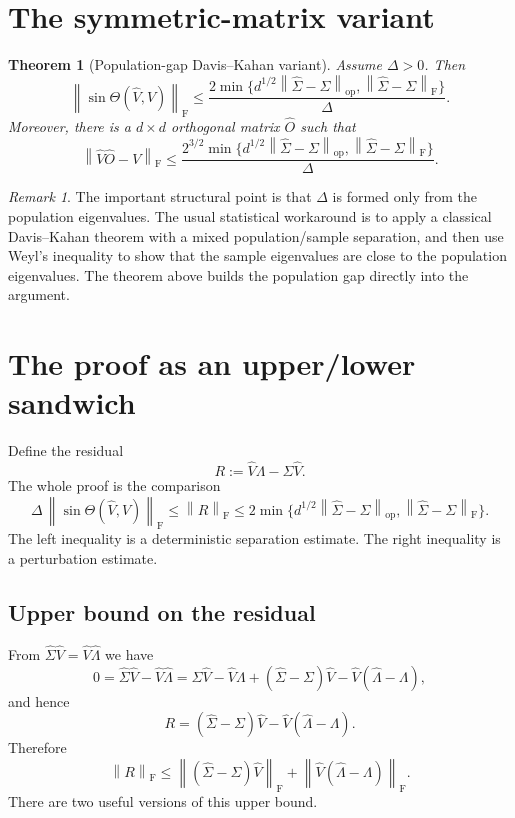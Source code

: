 \documentclass[11pt]{article}
\newcommand{\BaseMat}{\Sigma}
\newcommand{\PertMat}{\widehat{\Sigma}}
\newcommand{\ErrMat}{\widehat{\Sigma}-\Sigma}
\newcommand{\Sub}{V}
\newcommand{\Subhat}{\widehat V}
\newcommand{\EigDiag}{\Lambda}
\newcommand{\EigDiagHat}{\widehat\Lambda}
\newcommand{\AlignMat}{\widehat O}
\newcommand{\BaseMat}{A}
\newcommand{\PertMat}{\widetilde A}
\newcommand{\ErrMat}{\widetilde A-A}
\newcommand{\Sub}{Q}
\newcommand{\Subhat}{\widetilde Q}
\newcommand{\EigDiag}{D}
\newcommand{\EigDiagHat}{\widetilde D}
\newcommand{\AlignMat}{O}
\newcommand{\gap}{\Delta}
\newcommand{\norm}[1]{\left\lVert #1 \right\rVert}
\newcommand{\op}{\mathrm{op}}
\newcommand{\F}{\mathrm F}
\newtheorem{theorem}{Theorem}
\theoremstyle{remark}
\newtheorem*{remark}{Remark}
\begin{document}
\section{The symmetric-matrix variant}

\begin{theorem}[Population-gap Davis--Kahan variant]
Assume $\gap>0$.  Then
\[
  \norm{\sin\Theta(\Subhat,\Sub)}_{\F}
  \leq
  \frac{2\min\{d^{1/2}\norm{\ErrMat}_{\op},\norm{\ErrMat}_{\F}\}}{\gap}.
\]
Moreover, there is a $d\times d$ orthogonal matrix $\AlignMat$ such that
\[
  \norm{\Subhat\AlignMat-\Sub}_{\F}
  \leq
  \frac{2^{3/2}\min\{d^{1/2}\norm{\ErrMat}_{\op},\norm{\ErrMat}_{\F}\}}{\gap}.
\]
\end{theorem}

\begin{remark}
The important structural point is that $\gap$ is formed only from the
population eigenvalues.  The usual statistical workaround is to apply a
classical Davis--Kahan theorem with a mixed population/sample separation,
and then use Weyl's inequality to show that the sample eigenvalues are close
to the population eigenvalues.  The theorem above builds the population gap
directly into the argument.
\end{remark}

\section{The proof as an upper/lower sandwich}

Define the residual
\[
  R := \Subhat\EigDiag-\BaseMat\Subhat.
\]
The whole proof is the comparison
\[
  \gap\,\norm{\sin\Theta(\Subhat,\Sub)}_{\F}
  \leq \norm{R}_{\F}
  \leq 2\min\{d^{1/2}\norm{\ErrMat}_{\op},\norm{\ErrMat}_{\F}\}.
\]
The left inequality is a deterministic separation estimate.  The right
inequality is a perturbation estimate.

\subsection{Upper bound on the residual}

From $\PertMat\Subhat=\Subhat\EigDiagHat$ we have
\[
  0=\PertMat\Subhat-\Subhat\EigDiagHat
   =\BaseMat\Subhat-\Subhat\EigDiag+(\ErrMat)\Subhat
     -\Subhat(\EigDiagHat-\EigDiag),
\]
and hence
\[
  R=(\ErrMat)\Subhat-\Subhat(\EigDiagHat-\EigDiag).
\]
Therefore
\[
  \norm{R}_{\F}
  \leq \norm{(\ErrMat)\Subhat}_{\F}
      +\norm{\Subhat(\EigDiagHat-\EigDiag)}_{\F}.
\]
There are two useful versions of this upper bound.
\end{document}
